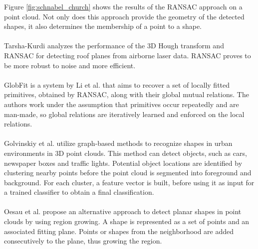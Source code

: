 Figure \ref{fig:schnabel_church} shows the results of the RANSAC approach on a point cloud. Not only does this approach provide the geometry of the detected shapes, it also determines the membership of a point to a shape. 
\\
\\
Tarsha-Kurdi \cite{tarsha2007hough} analyzes the performance of the 3D Hough transform and RANSAC for detecting roof planes from airborne laser data. RANSAC proves to be more robust to noise and more efficient.
\\
\\
GlobFit is a system by Li et al. \cite{li2011globfit} that aims to recover a set of locally fitted primitives, obtained by RANSAC, along with their global mutual relations. The authors work under the assumption that primitives occur repeatedly and are man-made, so global relations are iteratively learned and enforced on the local relations. 
\\
\\
Golvinskiy et al. \cite{golovinskiy2009shape} utilize graph-based methods to recognize shapes in urban environments in 3D point clouds. This method can detect objects, such as cars, newspaper boxes and traffic lights. Potential object locations are identified by clustering nearby points before the point cloud is segmented into foreground and background. For each cluster, a feature vector is built, before using it as input for a trained classifier to obtain a final classification. 
\\
\\
Oesau et al. \cite{oesau2016planar} propose an alternative approach to detect planar shapes in point clouds by using region growing. A shape is represented as a set of points and an associated fitting plane. Points or shapes from the neighborhood are added consecutively to the plane, thus growing the region. 